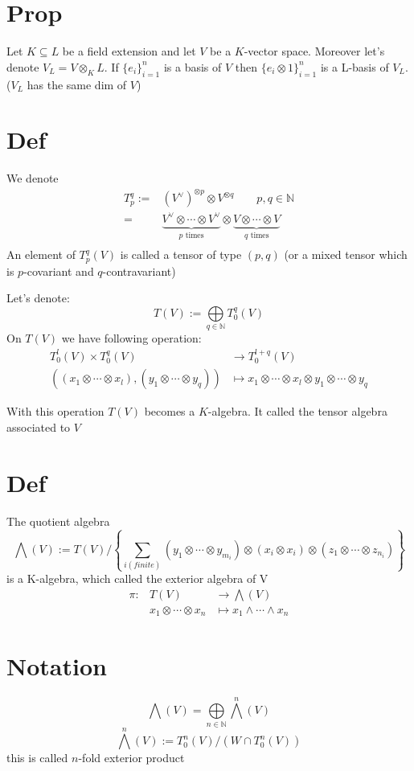 \documentclass{article}
\begin{document}
\section{Prop}
Let $K\subseteq L$ be a field extension and let $V$ be a $K$-vector space. Moreover let's denote $V_L=V\otimes_KL$. If $\{e_i\}_{i=1}^n$ is a basis of $V$ then $\{e_i\otimes 1\}_{i=1}^n$ is a L-basis of $V_L$.($V_L$ has the same dim of $V$)
\section{Def}
We denote
$$
\begin{aligned}
    T_p^q:=&(V^\vee)^{\otimes p}\otimes V^{\otimes q}\qquad p,q\in \mathbb{N}\\
    =&\underbrace{V^\vee\otimes\cdots\otimes V^\vee}\limits_{p\text{ times}}\otimes \underbrace{V\otimes\cdots\otimes V}\limits_{q\text{ times}}\\
\end{aligned}
$$
An element of $T_p^q(V)$ is called a tensor of type $(p,q)$ (or a mixed tensor which is $p$-covariant and $q$-contravariant)

Let's denote:
$$T(V):=\bigoplus\limits_{q\in \mathbb{N}} T_0^q(V)$$
On $T(V)$ we have following operation:
$$
\begin{aligned}
    T_0^l(V)\times T_0^q(V)&\rightarrow T_0^{l+q}(V)\\
    ((x_1\otimes\cdots\otimes x_l),(y_1\otimes\cdots\otimes y_q))&\mapsto x_1\otimes\cdots\otimes x_l\otimes y_1\otimes\cdots\otimes y_q
\end{aligned}
$$

With this operation $T(V)$ becomes a $K$-algebra. It called the tensor algebra associated to $V$

\section{Def}
The quotient algebra $$\bigwedge(V):=T(V)/\left\{\sum\limits_{i(finite)}(y_1\otimes\cdots\otimes y_{m_i})\otimes(x_i\otimes x_i)\otimes(z_1\otimes\cdots\otimes z_{n_i})\right\}$$
is a K-algebra, which called the exterior algebra of V
$$
\begin{aligned}
    \pi: &T(V) &\rightarrow \bigwedge(V)\\
    &x_1\otimes\cdots\otimes x_n &\mapsto x_1\wedge\cdots\wedge x_n
\end{aligned}$$
\section{Notation}
$$\bigwedge(V)=\bigoplus \limits_{n\in\mathbb{N}} \bigwedge^n(V)$$
$$\bigwedge^n(V):=T^n_0(V)/(W\cap T_0^n(V))$$
this is called $n$-fold exterior product
\end{document}
